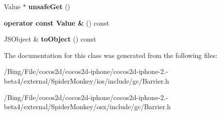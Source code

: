 \begin{DoxyCompactItemize}
\item 
\hypertarget{classjs_1_1_read_barriered_value_ab79f0c28324521f05ad34f818c1ab579}{Value $\ast$ {\bfseries unsafe\-Get} ()}\label{classjs_1_1_read_barriered_value_ab79f0c28324521f05ad34f818c1ab579}

\item 
\hypertarget{classjs_1_1_read_barriered_value_affa6a3c85a865eb0bdc8737a8067d235}{{\bfseries operator const Value \&} () const }\label{classjs_1_1_read_barriered_value_affa6a3c85a865eb0bdc8737a8067d235}

\item 
\hypertarget{classjs_1_1_read_barriered_value_aec9d8d7af5dbf168ea039b522aa45ef7}{J\-S\-Object \& {\bfseries to\-Object} () const }\label{classjs_1_1_read_barriered_value_aec9d8d7af5dbf168ea039b522aa45ef7}

\end{DoxyCompactItemize}


The documentation for this class was generated from the following files\-:\begin{DoxyCompactItemize}
\item 
/\-Bing/\-File/cocos2d/cocos2d-\/iphone/cocos2d-\/iphone-\/2.-\/beta4/external/\-Spider\-Monkey/ios/include/gc/Barrier.\-h\item 
/\-Bing/\-File/cocos2d/cocos2d-\/iphone/cocos2d-\/iphone-\/2.-\/beta4/external/\-Spider\-Monkey/osx/include/gc/Barrier.\-h\end{DoxyCompactItemize}
